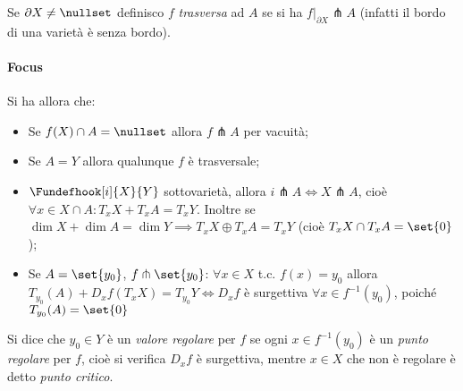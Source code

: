 \begin{defn}
Se $\partial X \neq \nullset$ definisco $f$ \emph{trasversa} ad $A$ se si ha $f|_{\partial X} \pitchfork A$ (infatti il bordo di una varietà è senza bordo).
\end{defn}

\paragraph{Focus}
Si ha allora che:
\begin{itemize}
\item Se $f(X) \cap A = \nullset$ allora $f \pitchfork A$ per vacuità;
\item Se $A = Y$ allora qualunque $f$ è trasversale;
\item $\Fundefhook[i]{X}{Y}$ sottovarietà, allora $i \pitchfork A \iff X \pitchfork A$, cioè $\forall x \in X\cap A: T_xX + T_xA = T_xY$.
Inoltre se $\dim X +\dim A = \dim Y \implies T_xX \oplus T_xA = T_xY$ (cioè $T_xX \cap T_xA = \set{0}$);
\item Se $A = \set{y_0}$, $f \pitchfork \set{y_0}$:
$\forall x \in X$ t.c. $f(x) = y_0$ allora $T_{y_0}(A) + D_xf(T_xX) = T_{y_0}Y \iff D_xf$ è surgettiva $\forall x \in f^{-1}(y_0)$, poiché $T_{y_0}(A) = \set{0}$
\end{itemize}

\begin{defn}
Si dice che $y_0 \in Y$ è un \emph{valore regolare} per $f$ se ogni $x \in f^{-1}(y_0)$ è un \emph{punto regolare} per $f$, cioè si verifica $D_xf$ è surgettiva, mentre $x \in X$ che non è regolare è detto \emph{punto critico}.
\end{defn}
